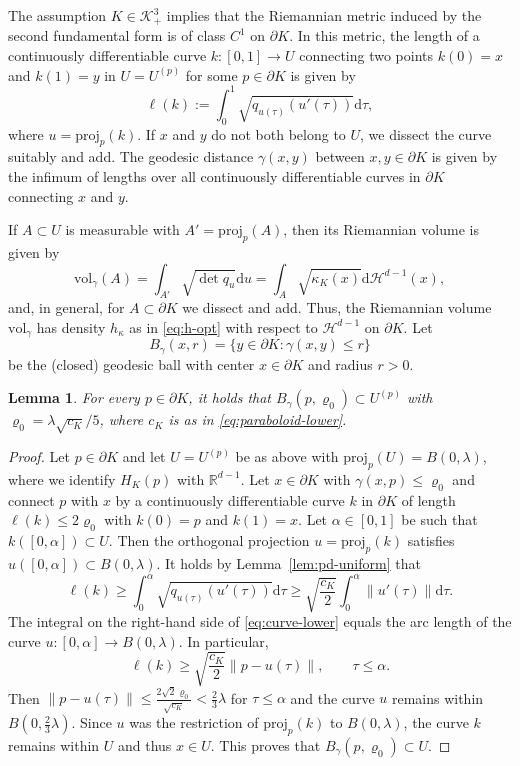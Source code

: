 \documentclass[a4paper,12pt,reqno]{amsart}
\newtheorem{lem}[thm]{Lemma}
\theoremstyle{definition}
\newcommand{\IR}{\mathbb{R}}
\newcommand{\cH}{\mathcal{H}}
\newcommand{\cK}{\mathcal{K}}
\newcommand{\vol}{\mathrm{vol}}
\newcommand{\proj}{\mathrm{proj}}
\newcommand{\dd}{\mathrm{d}}
\begin{document}
The assumption $K\in \cK^3_+$ implies that the Riemannian metric induced by the second fundamental form is of class $C^1$ on $\partial K$. In this metric, the length of a continuously differentiable curve $k\colon [0,1]\to U$ connecting two points $k(0)=x$ and $k(1)=y$ in $U=U^{(p)}$ for some $p\in \partial K$ is given by 
\[
\ell(k)
:= \int_0^1 \sqrt{q_{u(\tau)}(u'(\tau))} \dd \tau,
\]
where $u=\proj_p(k)$.  If $x$ and $y$ do not both belong to $U$, we dissect the curve suitably and add. The geodesic distance $\gamma(x,y)$ between $x,y\in \partial K$ is given by the infimum of lengths over all continuously differentiable curves in $\partial K$ connecting $x$ and $y$. 

If $A\subset U$ is measurable with $A'=\proj_p(A)$, then its Riemannian volume is given by
\[
\vol_{\gamma}(A)
=\int_{A'}\sqrt{\det q_{u}}\dd u
=\int_{A}\sqrt{\kappa_K(x)}\dd \cH^{d-1}(x),
\]
and, in general, for $A\subset \partial K$ we dissect and add. Thus, the Riemannian volume $\vol_{\gamma}$ has density $h_{\kappa}$ as in \eqref{eq:h-opt} with respect to $\cH^{d-1}$ on $\partial K$. Let
\[
B_{\gamma}(x,r)
=\{y\in \partial K\colon \gamma(x,y)\le r\}
\]
be the (closed) geodesic ball with center $x\in \partial K$ and radius $r>0$. 

\begin{lem}\label{lem:small-ball}
	For every $p\in \partial K$, it holds that $B_{\gamma}(p,\varrho_0)\subset U^{(p)}$ with
	$\varrho_0=\lambda\sqrt{c_K}/5$, where $c_{K}$ is as in \eqref{eq:paraboloid-lower}.
\end{lem}
\begin{proof}
Let $p\in \partial K$ and let $U=U^{(p)}$ be as above with $\proj_{p}(U)=B(0,\lambda)$, where we identify $H_K(p)$ with $\IR^{d-1}$. Let $x\in \partial K$ with $\gamma(x,p)\le \varrho_0$ and connect $p$ with $x$ by a continuously differentiable curve $k$ in $\partial K$ of length $\ell(k)\le 2\varrho_0$ with $k(0)=p$ and $k(1)=x$.  Let $\alpha\in [0,1]$ be such that $k([0,\alpha])\subset U$. Then the orthogonal projection $u=\proj_p(k)$ satisfies $u([0,\alpha])\subset B(0,\lambda)$. It holds by Lemma~\ref{lem:pd-uniform} that 
\begin{equation} \label{eq:curve-lower}
\ell(k)
\ge \int_0^{\alpha}\sqrt{q_{u(\tau)}(u'(\tau))}\dd\tau
\ge \sqrt{\frac{c_K}{2}}\int_0^{\alpha}\|u'(\tau)\|\dd\tau.
\end{equation}
The integral on the right-hand side of \eqref{eq:curve-lower} equals the arc length of the curve $u\colon [0,\alpha]\to B(0,\lambda)$.  In particular, 
\[
\ell(k)
\ge  \sqrt{\frac{c_K}{2}}\|p-u(\tau)\|,\qquad \tau\le \alpha.
\]
Then $\|p-u(\tau)\|\le \frac{2\sqrt{2}\varrho_0}{\sqrt{c_K}}< \frac{2}{3}\lambda$ for $\tau\le \alpha$ and the curve $u$ remains within $B(0,\frac{2}{3}\lambda)$. Since $u$ was the restriction of $\proj_p(k)$ to $B(0,\lambda)$, the curve $k$ remains within $U$ and thus $x\in U$. This proves that $B_{\gamma}(p,\varrho_0)\subset U$.
\end{proof}
\end{document}
